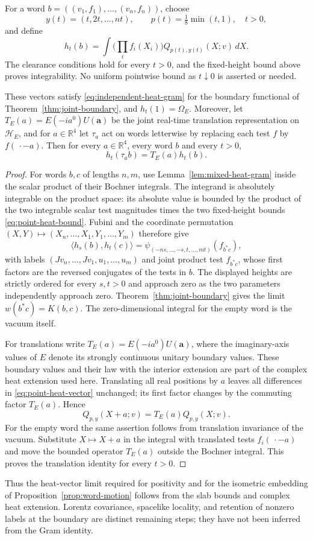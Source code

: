 For a word $b=((v_1,f_1),\ldots,(v_n,f_n))$, choose
\[
 y(t)=(t,2t,\ldots,nt),\qquad p(t)=\tfrac18\min(t,1),\quad t>0,
\]
and define
\[
 h_t(b)=\int\Big(\prod_i f_i(X_i)\Big)
                  Q_{p(t),y(t)}(X;v)\,dX.
\]
The clearance conditions hold for every $t>0$, and the fixed-height bound
above proves integrability. No uniform pointwise bound as $t\downarrow0$
is asserted or needed.

\begin{proposition}\label{prop:heat-cups}
These vectors satisfy \eqref{eq:independent-heat-gram} for the boundary
functional of Theorem~\ref{thm:joint-boundary}, and $h_t(1)=\Omega_E$.
Moreover, let $T_E(a)=E(-ia^0)U(\mathbf a)$ be the joint real-time
translation representation on $\mathcal H_E$, and for $a\in\mathbb R^4$
let $\tau_a$ act on words letterwise by replacing each test $f$ by
$f(\,\cdot-a)$. Then for every $a\in\mathbb R^4$, every word $b$ and
every $t>0$,
\[
 h_t(\tau_ab)=T_E(a)h_t(b).
\]
\end{proposition}
\begin{proof}
For words $b,c$ of lengths $n,m$, use
Lemma~\ref{lem:mixed-heat-gram} inside the scalar product of their
Bochner integrals. The integrand is absolutely integrable on the product
space: its absolute value is bounded by the product of the two integrable
scalar test magnitudes times the two fixed-height bounds
\eqref{eq:point-heat-bound}. Fubini and the coordinate permutation
$(X,Y)\mapsto(X_n,\ldots,X_1,Y_1,\ldots,Y_m)$ therefore give
\[
 \langle h_s(b),h_t(c)\rangle
 =\psi_{(-ns,\ldots,-s,t,\ldots,mt)}(f_{b^*c}),
\]
with labels $(Jv_n,\ldots,Jv_1,u_1,\ldots,u_m)$ and joint product test
$f_{b^*c}$, whose first factors are the reversed conjugates of the tests
in $b$. The displayed heights are strictly ordered for every $s,t>0$
and approach zero as the two parameters independently approach zero.
Theorem~\ref{thm:joint-boundary} gives the limit $w(b^*c)=K(b,c)$.
The zero-dimensional integral for the empty word is the vacuum itself.

For translations write $T_E(a)=E(-ia^0)U(\mathbf a)$, where the
imaginary-axis values of $E$ denote its strongly continuous unitary boundary
values. These boundary values and their law with the interior extension are
part of the complex heat extension used here. Translating all real
positions by $a$ leaves all differences in
\eqref{eq:point-heat-vector} unchanged; its first factor changes by the
commuting factor $T_E(a)$. Hence
\[
 Q_{p,y}(X+a;v)=T_E(a)Q_{p,y}(X;v).
\]
For the empty word the same assertion follows from translation invariance
of the vacuum. Substitute $X\mapsto X+a$ in the integral with translated
tests $f_i(\,\cdot-a)$ and move the bounded operator $T_E(a)$ outside the
Bochner integral. This proves the translation identity for every $t>0$.
\end{proof}

Thus the heat-vector limit required for positivity and for the isometric
embedding of Proposition~\ref{prop:word-motion} follows from the slab
bounds and complex heat extension. Lorentz covariance, spacelike locality,
and retention of nonzero labels at the boundary are distinct remaining
steps; they have not been inferred from the Gram identity.
